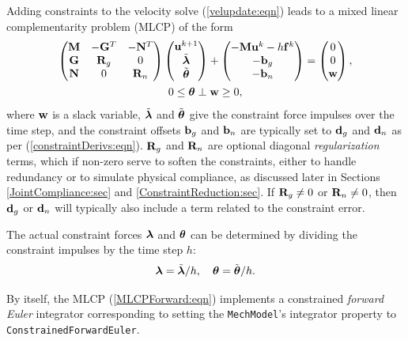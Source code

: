 Adding constraints to the velocity solve (\ref{velupdate:eqn})
leads to a mixed linear complementarity problem (MLCP)
of the form
%
\begin{gather}
\left(
\begin{matrix}
{\bf M} & -{\bf G}^{T} & -{\bf N}^{T} \\
{\bf G} & {\bf R}_g & 0 \\
{\bf N} & 0 & {\bf R}_n 
\end{matrix}
\right)
\left(
\begin{matrix}
{\bf u}^{k+1} \\
\tilde{\boldsymbol\lambda} \\
\tilde{\boldsymbol\theta}
\end{matrix}
\right)
+
\left(
\begin{matrix}
-{\bf M} {\bf u}^{k} - h {\bf f}^{k} \\
-{\bf b}_g \\
-{\bf b}_n
\end{matrix}
\right)
=
\left(
\begin{matrix}
0 \\
0 \\
{\bf w}
\end{matrix}
\right), \notag \\
0 \le \boldsymbol\theta \perp {\bf w} \ge 0,
\label{MLCPForward:eqn}
\end{gather}
where ${\bf w}$ is a slack variable, $\tilde{\boldsymbol\lambda}$ and $\tilde{\boldsymbol\theta}$ give the
constraint force impulses over the time step, and the constraint offsets ${\bf b}_g$
and ${\bf b}_n$ are typically set to ${\bf d}_g$ and ${\bf d}_n$ as per
(\ref{constraintDerivs:eqn}). ${\bf R}_g$ and ${\bf R}_n$ are optional diagonal {\it
regularization} terms, which if non-zero serve to soften the constraints,
either to handle redundancy or to simulate physical compliance, as discussed
later in Sections \ref{JointCompliance:sec}
and \ref{ConstraintReduction:sec}. If ${\bf R}_g \ne 0$ or ${\bf R}_n \ne 0$, then ${\bf d}_g$
or ${\bf d}_n$ will typically also include a term related to the constraint error.

The actual constraint forces $\boldsymbol\lambda$ and $\boldsymbol\theta$ can be determined by dividing
the constraint impulses by the time step $h$:
%
\begin{equation}
\boldsymbol\lambda = \tilde{\boldsymbol\lambda}/h, \quad \boldsymbol\theta = \tilde{\boldsymbol\theta}/h.
\label{impulsesToForces:eqn}
\end{equation}
%

By itself, the MLCP (\ref{MLCPForward:eqn}) implements a constrained {\it
forward Euler} integrator corresponding to setting the {\tt MechModel}'s {\sf
integrator} property to {\tt ConstrainedForwardEuler}. 


